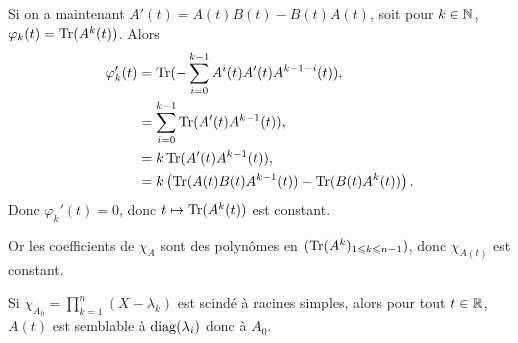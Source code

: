 \documentclass[12pt]{article}
\begin{document}
\begin{remark}
	Si on a maintenant $A'(t)=A(t)B(t)-B(t)A(t)$, soit pour $k\in\mathbb{N}$, $\varphi_k(t)=\operatorname{Tr}(A^{k}(t))$. Alors 
	\begin{align}
		\varphi_k'(t)
		&=\operatorname{Tr}(-\sum_{i=0}^{k-1}A^{i}(t)A'(t)A^{k-1-i}(t)),\\
		&=\sum_{i=0}^{k-1}\operatorname{Tr}(A'(t)A^{k-1}(t)),\\
		&=k\operatorname{Tr}(A'(t)A^{k-1}(t)),\\
		&=k\left(\operatorname{Tr}(A(t)B(t)A^{k-1}(t))-\operatorname{Tr}(B(t)A^{k}(t))\right).
	\end{align}
	Donc $\varphi_k'(t)=0$, donc $t\mapsto\operatorname{Tr}(A^{k}(t))$ est constant.

	Or les coefficients de $\chi_{A}$ sont des polynômes en $(\operatorname{Tr}(A^{k})_{1\leqslant k\leqslant n-1})$, donc $\chi_{A(t)}$ est constant.

	Si $\chi_{A_{0}}=\prod_{k=1}^{n}(X-\lambda_k)$ est scindé à racines simples, alors pour tout $t\in\mathbb{R}$, $A(t)$ est semblable à $\operatorname{diag}(\lambda_i)$ donc à $A_0$.
\end{remark}
\end{document}
